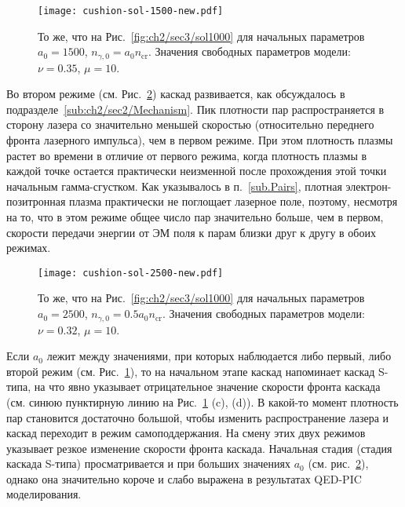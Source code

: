 \begin{figure}[ht]
    \texttt{[image: cushion-sol-1500-new.pdf]}
    \caption[То же, что на Рис.~\ref{fig:ch2/sec3/sol1000} для начальных параметров $a_0=1500$, $n_{\gamma,0}=a_0 n_\mathrm{cr}$]{\label{fig:ch2/sec3/sol1500} 
    То же, что на Рис.~\ref{fig:ch2/sec3/sol1000} для начальных параметров $a_0=1500$, $n_{\gamma,0}=a_0 n_\mathrm{cr}$. Значения свободных параметров модели: $\nu=0.35$, $\mu=10$.}
\end{figure}

Во втором режиме (см. Рис.~\ref{fig:ch2/sec3/sol2500}) каскад развивается, как обсуждалось в подразделе~\ref{sub:ch2/sec2/Mechanism}.
Пик плотности пар распространяется в сторону лазера со значительно меньшей скоростью (относительно переднего фронта лазерного импульса), чем в первом режиме.
При этом плотность плазмы растет во времени в отличие от первого режима, когда плотность плазмы в каждой точке остается практически неизменной после прохождения этой точки начальным гамма-сгустком.
Как указывалось в п.~\ref{sub.Pairs}, плотная электрон-позитронная плазма практически не поглощает лазерное поле, поэтому, несмотря на то, что в этом режиме общее число пар значительно больше, чем в первом, скорости передачи энергии от ЭМ поля к парам близки друг к другу в обоих режимах.

\begin{figure}[ht]
    \texttt{[image: cushion-sol-2500-new.pdf]}
    \caption[То же, что на Рис.~\ref{fig:ch2/sec3/sol1000} для начальных параметров $a_0=2500$, $n_{\gamma,0}=0.5a_0 n_\mathrm{cr}$]{\label{fig:ch2/sec3/sol2500} 
    То же, что на Рис.~\ref{fig:ch2/sec3/sol1000} для начальных параметров $a_0=2500$, $n_{\gamma,0}=0.5a_0 n_\mathrm{cr}$. Значения свободных параметров модели: $\nu=0.32$, $\mu=10$.}
\end{figure}

Если $a_0$ лежит между значениями, при которых наблюдается либо первый, либо второй режим (см. Рис.~\ref{fig:ch2/sec3/sol1500}), то на начальном этапе каскад напоминает каскад S-типа, на что явно указывает отрицательное значение скорости фронта каскада (см. синюю пунктирную линию на Рис.~\ref{fig:ch2/sec3/sol1500} (c), (d)). 
В какой-то момент плотность пар становится достаточно большой, чтобы изменить распространение лазера и каскад переходит в режим самоподдержания.
На смену этих двух режимов указывает резкое изменение скорости фронта каскада.
Начальная стадия (стадия каскада S-типа) просматривается и при больших значениях $a_0$ (см. рис.~\ref{fig:ch2/sec3/sol2500}), однако она значительно короче и слабо выражена в результатах QED-PIC моделирования.

